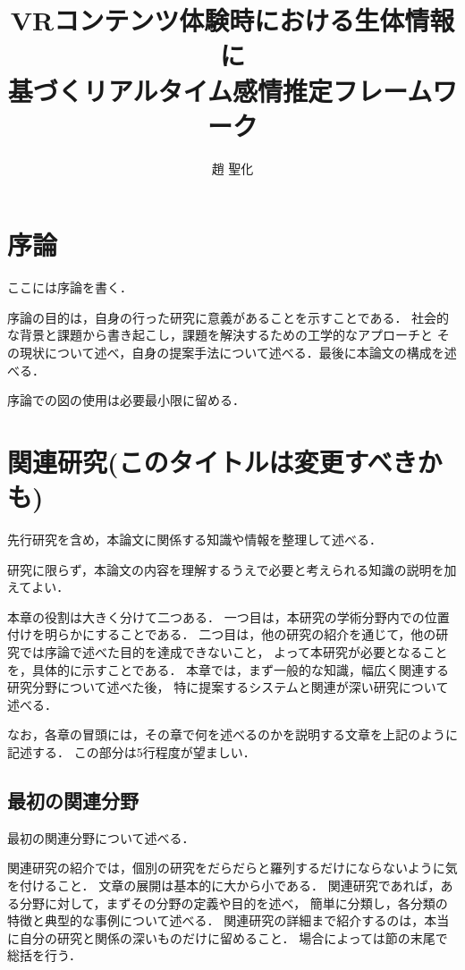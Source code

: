 \documentclass[book,paper=a4,fontsize=10pt,jafontscale=0.92]{jlreq}
\title{VRコンテンツ体験時における生体情報に\\基づくリアルタイム感情推定フレームワーク} %
\author{趙 聖化} %
\begin{document}

\jtitlepage %
\clearpage %
\jabstractpage %
\clearpage %
\tableofcontents %
\clearpage %
\listoftables %
\clearpage %
\listoffigures %
\clearpage %

\chapter{序論}

ここには序論を書く．

序論の目的は，自身の行った研究に意義があることを示すことである．
社会的な背景と課題から書き起こし，課題を解決するための工学的なアプローチと
その現状について述べ，自身の提案手法について述べる．最後に本論文の構成を述べる．

序論での図の使用は必要最小限に留める．

\chapter{関連研究(このタイトルは変更すべきかも)}

先行研究を含め，本論文に関係する知識や情報を整理して述べる．

研究に限らず，本論文の内容を理解するうえで必要と考えられる知識の説明を加えてよい．

本章の役割は大きく分けて二つある．
一つ目は，本研究の学術分野内での位置付けを明らかにすることである．
二つ目は，他の研究の紹介を通じて，他の研究では序論で述べた目的を達成できないこと，
よって本研究が必要となることを，具体的に示すことである．
本章では，まず一般的な知識，幅広く関連する研究分野について述べた後，
特に提案するシステムと関連が深い研究について述べる．

なお，各章の冒頭には，その章で何を述べるのかを説明する文章を上記のように記述する．
この部分は5行程度が望ましい．

\section{最初の関連分野}

最初の関連分野について述べる．

関連研究の紹介では，個別の研究をだらだらと羅列するだけにならないように気を付けること．
文章の展開は基本的に大から小である．
関連研究であれば，ある分野に対して，まずその分野の定義や目的を述べ，
簡単に分類し，各分類の特徴と典型的な事例について述べる．
関連研究の詳細まで紹介するのは，本当に自分の研究と関係の深いものだけに留めること．
場合によっては節の末尾で総括を行う．
\end{document}
